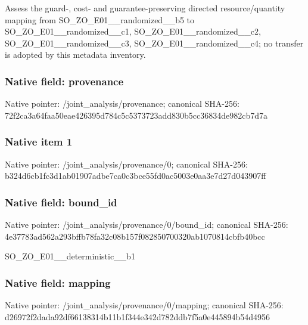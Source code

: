 \documentclass[10pt,a4paper]{article}
\begin{document}
\begingroup\raggedright\sloppy Assess the guard-,\allowbreak{} cost- and guarantee-preserving directed resource/\allowbreak{}quantity mapping from SO\_\allowbreak{}ZO\_\allowbreak{}E01\_\allowbreak{}\_\allowbreak{}randomized\_\allowbreak{}\_\allowbreak{}b5 to SO\_\allowbreak{}ZO\_\allowbreak{}E01\_\allowbreak{}\_\allowbreak{}randomized\_\allowbreak{}\_\allowbreak{}c1,\allowbreak{} SO\_\allowbreak{}ZO\_\allowbreak{}E01\_\allowbreak{}\_\allowbreak{}randomized\_\allowbreak{}\_\allowbreak{}c2,\allowbreak{} SO\_\allowbreak{}ZO\_\allowbreak{}E01\_\allowbreak{}\_\allowbreak{}randomized\_\allowbreak{}\_\allowbreak{}c3,\allowbreak{} SO\_\allowbreak{}ZO\_\allowbreak{}E01\_\allowbreak{}\_\allowbreak{}randomized\_\allowbreak{}\_\allowbreak{}c4;\allowbreak{} no transfer is adopted by this metadata inventory.\par\endgroup

\subsubsection{Native field: provenance}
Native pointer: /joint\_\allowbreak{}analysis/provenance; canonical SHA-256: 72f2ca3a64faa50eae426395d784c5c5373723add830b5cc36834de982cb7d7a

\subsubsection{Native item 1}
Native pointer: /joint\_\allowbreak{}analysis/provenance/0; canonical SHA-256: b324d6cb1fc3d1ab01907adbe7ca0c3bce55fd0ac5003e0aa3e7d27d043907ff

\subsubsection{Native field: bound\_\allowbreak{}id}
Native pointer: /joint\_\allowbreak{}analysis/provenance/0/bound\_\allowbreak{}id; canonical SHA-256: 4e37783ad562a293bffb78fa32c08b157f082850700320ab1070814cbfb40bcc

\begingroup\raggedright\sloppy SO\_\allowbreak{}ZO\_\allowbreak{}E01\_\allowbreak{}\_\allowbreak{}deterministic\_\allowbreak{}\_\allowbreak{}b1\par\endgroup

\subsubsection{Native field: mapping}
Native pointer: /joint\_\allowbreak{}analysis/provenance/0/mapping; canonical SHA-256: d26972f2dada92df66138314b11b1f344e342d782ddb7f5a0e445894b54d4956
\end{document}
